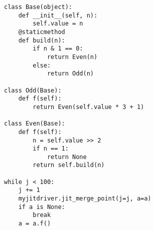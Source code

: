 \begin{verbatim}
class Base(object):
    def __init__(self, n):
        self.value = n
    @staticmethod
    def build(n):
        if n & 1 == 0:
            return Even(n)
        else:
            return Odd(n)

class Odd(Base):
    def f(self):
        return Even(self.value * 3 + 1)

class Even(Base):
    def f(self):
        n = self.value >> 2
        if n == 1:
            return None
        return self.build(n)

while j < 100:
    j += 1
    myjitdriver.jit_merge_point(j=j, a=a)
    if a is None:
        break
    a = a.f()
\end{verbatim}
